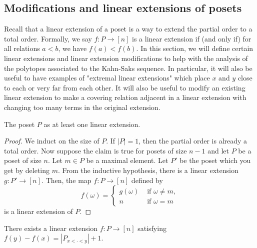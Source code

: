 \documentclass{puthesis-UG}
\begin{document}
\subsection{Modifications and linear extensions of posets}

Recall that a linear extension of a poset is a way to extend the partial order to a total order. Formally, we say $f : P \to [n]$ is a linear extension if (and only if) for all relations $a < b$, we have $f(a) < f(b)$. In this section, we will define certain linear extensions and linear extension modifications to help with the analysis of the polytopes associated to the Kahn-Saks sequence. In particular, it will also be useful to have examples of "extremal linear extensions" which place $x$ and $y$ close to each or very far from each other. It will also be useful to modify an existing linear extension to make a covering relation adjacent in a linear extension with changing too many terms in the original extension. 

\begin{prop} \label{extension-exists}
    The poset $P$ as at least one linear extension.
\end{prop}

\begin{proof}
    We induct on the size of $P$. If $|P| = 1$, then the partial order is already a total order. Now suppose the claim is true for posets of size $n-1$ and let $P$ be a poset of size $n$. Let $m \in P$ be a maximal element. Let $P'$ be the poset which you get by deleting $m$. From the inductive hypothesis, there is a linear extension $g : P' \to [n]$. Then, the map $f : P \to [n]$ defined by 
    \[
        f(\omega) = 
        \begin{cases}
            g(\omega) & \text{ if $\omega \neq m$}, \\
            n & \text{ if $\omega = m$}
        \end{cases}
    \]
    is a linear extension of $P$.
\end{proof}

\begin{prop} \label{extension-narrow-exists}
    There exists a linear extension $f : P \to [n]$ satisfying $f(y) - f(x) = |P_{x < \cdot < y}| + 1$. 
\end{prop}
\end{document}
